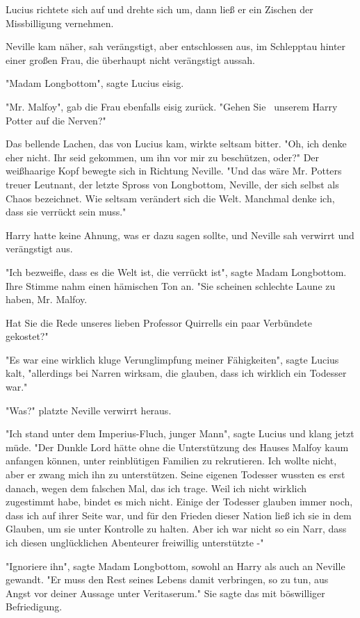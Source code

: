{Lucius richtete sich auf und drehte sich um, dann ließ er ein Zischen der Missbilligung vernehmen.

Neville kam näher, sah verängstigt, aber entschlossen aus, im Schlepptau hinter einer großen Frau, die überhaupt nicht verängstigt aussah.

"Madam Longbottom", sagte Lucius eisig.

"Mr. Malfoy", gab die Frau ebenfalls eisig zurück. "Gehen Sie ~unserem Harry Potter auf die Nerven?"

Das bellende Lachen, das von Lucius kam, wirkte seltsam bitter. "Oh, ich denke eher nicht. Ihr seid gekommen, um ihn vor mir zu beschützen, oder?" Der weißhaarige Kopf bewegte sich in Richtung Neville. "Und das wäre Mr. Potters treuer Leutnant, der letzte Spross von Longbottom, Neville, der sich selbst als Chaos bezeichnet. Wie seltsam verändert sich die Welt. Manchmal denke ich, dass sie verrückt sein muss."

Harry hatte keine Ahnung, was er dazu sagen sollte, und Neville sah verwirrt und verängstigt aus.

"Ich bezweifle, dass es die Welt ist, die verrückt ist", sagte Madam Longbottom. Ihre Stimme nahm einen hämischen Ton an. "Sie scheinen schlechte Laune zu haben, Mr. Malfoy.

Hat Sie die Rede unseres lieben Professor Quirrells ein paar Verbündete gekostet?"

"Es war eine wirklich kluge Verunglimpfung meiner Fähigkeiten", sagte Lucius kalt, "allerdings bei Narren wirksam, die glauben, dass ich wirklich ein Todesser war."

"Was?" platzte Neville verwirrt heraus.

"Ich stand unter dem Imperius-Fluch, junger Mann", sagte Lucius und klang jetzt müde. "Der Dunkle Lord hätte ohne die Unterstützung des Hauses Malfoy kaum anfangen können, unter reinblütigen Familien zu rekrutieren. Ich wollte nicht, aber er zwang mich ihn zu unterstützen. Seine eigenen Todesser wussten es erst danach, wegen dem falschen Mal, das ich trage. Weil ich nicht wirklich zugestimmt habe, bindet es mich nicht. Einige der Todesser glauben immer noch, dass ich auf ihrer Seite war, und für den Frieden dieser Nation ließ ich sie in dem Glauben, um sie unter Kontrolle zu halten. Aber ich war nicht so ein Narr, dass ich diesen unglücklichen Abenteurer freiwillig unterstützte -"

"Ignoriere ihn", sagte Madam Longbottom, sowohl an Harry als auch an Neville gewandt. "Er muss den Rest seines Lebens damit verbringen, so zu tun, aus Angst vor deiner Aussage unter Veritaserum." Sie sagte das mit böswilliger Befriedigung.

}
